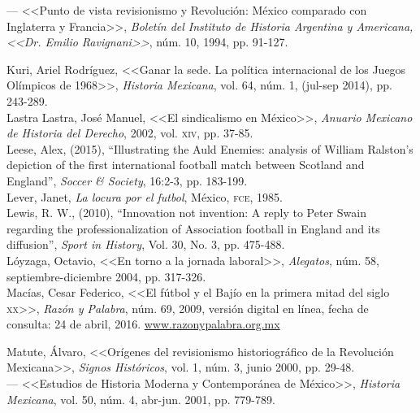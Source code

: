 \documentclass[11pt,a5paper,twoside]{book} %
\begin{document}
\begin{hangparas}{1cm}{1}
\noindent --- <<Punto de vista revisionismo y Revolución: México comparado con Inglaterra y Francia>>, \emph{Boletín del Instituto de Historia Argentina y Americana, <<Dr. Emilio Ravignani>>}, núm. 10, 1994, pp. 91-127. \\

\pagebreak

\noindent Kuri, Ariel Rodríguez, <<Ganar la sede. La política internacional de los Juegos Olímpicos de 1968>>, \emph{Historia Mexicana}, vol. 64, núm. 1, (jul-sep 2014), pp. 243-289. \\

\noindent Lastra Lastra, José Manuel, <<El sindicalismo en México>>, \emph{Anuario Mexicano de Historia del Derecho}, 2002, vol. \textsc{xiv}, pp. 37-85. \\

\noindent Leese, Alex, (2015), “Illustrating the Auld Enemies: analysis of William Ralston’s depiction of the first international football match between Scotland and England”, \emph{Soccer \& Society}, 16:2-3, pp. 183-199. \\

\noindent Lever, Janet, \emph{La locura por el futbol}, México, \textsc{fce}, 1985. \\

\noindent Lewis, R. W., (2010), “Innovation not invention: A reply to Peter Swain regarding the professionalization of Association football in England and its diffusion”, \emph{Sport in History}, Vol. 30, No. 3, pp. 475-488. \\

\noindent Lóyzaga, Octavio, <<En torno a la jornada laboral>>, \emph{Alegatos}, núm. 58, septiembre-diciembre 2004, pp. 317-326. \\

\noindent Macías, Cesar Federico, <<El fútbol y el Bajío en la primera mitad del siglo \textsc{xx}>>, \emph{Razón y Palabra}, núm. 69, 2009, versión digital en línea, fecha de consulta: 24 de abril, 2016. \url{www.razonypalabra.org.mx} \\

\pagebreak

\noindent Matute, Álvaro, <<Orígenes del revisionismo historiográfico de la Revolución Mexicana>>,
\emph{Signos Históricos}, vol. 1, núm. 3, junio 2000, pp. 29-48. \\

\noindent --- <<Estudios de Historia Moderna y Contemporánea de México>>, \emph{Historia Mexicana}, vol. 50, núm. 4, abr-jun. 2001, pp. 779-789. \\


\end{hangparas}
\end{document}
